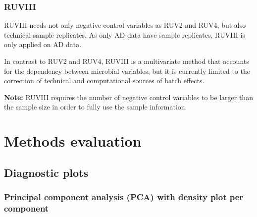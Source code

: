 \documentclass[]{book}
\newenvironment{Shaded}{\begin{snugshade}}{\end{snugshade}}
\newcommand{\KeywordTok}[1]{\textcolor[rgb]{0.13,0.29,0.53}{\textbf{#1}}}
\newcommand{\DataTypeTok}[1]{\textcolor[rgb]{0.13,0.29,0.53}{#1}}
\newcommand{\StringTok}[1]{\textcolor[rgb]{0.31,0.60,0.02}{#1}}
\newcommand{\CommentTok}[1]{\textcolor[rgb]{0.56,0.35,0.01}{\textit{#1}}}
\newcommand{\OperatorTok}[1]{\textcolor[rgb]{0.81,0.36,0.00}{\textbf{#1}}}
\newcommand{\NormalTok}[1]{#1}
\begin{document}
\subsection{RUVIII}\label{ruviii}

RUVIII needs not only negative control variables as RUV2 and RUV4, but
also technical sample replicates. As only AD data have sample
replicates, RUVIII is only applied on AD data.

In contrast to RUV2 and RUV4, RUVIII is a multivariate method that
accounts for the dependency between microbial variables, but it is
currently limited to the correction of technical and computational
sources of batch effects.

\textbf{Note:} RUVIII requires the number of negative control variables
to be larger than the sample size in order to fully use the sample
information.

\begin{Shaded}
\end{Shaded}

\chapter{Methods evaluation}\label{eval}

\section{Diagnostic plots}\label{diagnostic-plots}

\subsection{Principal component analysis (PCA) with density plot per
component}\label{principal-component-analysis-pca-with-density-plot-per-component-1}
\end{document}
